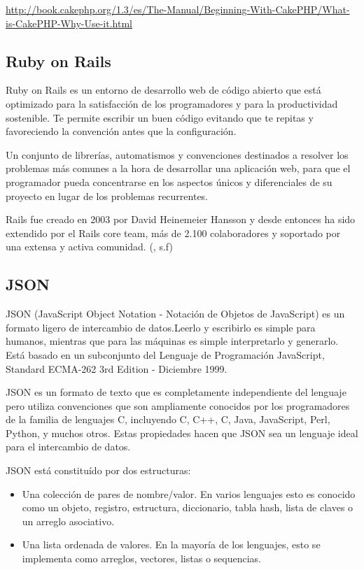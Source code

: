 \url{http://book.cakephp.org/1.3/es/The-Manual/Beginning-With-CakePHP/What-is-CakePHP-Why-Use-it.html}

\subsection{Ruby on Rails}
\setlength{\parskip}{5mm}
Ruby on Rails es un entorno de desarrollo web de código abierto que está optimizado para la satisfacción de los programadores y para la productividad sostenible. Te permite escribir un buen código evitando que te repitas y favoreciendo la convención antes que la configuración.

Un conjunto de librerías, automatismos y convenciones destinados a resolver los problemas más comunes a la hora de desarrollar una aplicación web, para que el programador pueda concentrarse en los aspectos únicos y diferenciales de su proyecto en lugar de los problemas recurrentes.

Rails fue creado en 2003 por David Heinemeier Hansson y desde entonces ha sido extendido por el Rails core team, más de 2.100 colaboradores y soportado por una extensa y activa comunidad. (\citet{rubybib}, s.f)

\setlength{\parskip}{0mm}



\subsection{JSON}
\setlength{\parskip}{5mm}
JSON (JavaScript Object Notation - Notación de Objetos de JavaScript) es un formato ligero de intercambio de datos.Leerlo y escribirlo es simple para humanos, mientras que para las máquinas es simple interpretarlo y generarlo. Está basado en un subconjunto del Lenguaje de Programación JavaScript, Standard ECMA-262 3rd Edition - Diciembre 1999. 

JSON es un formato de texto que es completamente independiente del lenguaje pero utiliza convenciones que son ampliamente conocidos por los programadores de la familia de lenguajes C, incluyendo C, C++, C, Java, JavaScript, Perl, Python, y muchos otros. Estas propiedades hacen que JSON sea un lenguaje ideal para el intercambio de datos.

JSON está constituído por dos estructuras:
 \setlength{\parskip}{0mm}
\begin{itemize}

	\item Una colección de pares de nombre/valor. En varios lenguajes esto es conocido como un objeto, registro, estructura, diccionario, tabla hash, lista de claves o un arreglo asociativo.
	
	\item Una lista ordenada de valores. En la mayoría de los lenguajes, esto se implementa como arreglos, vectores, listas o sequencias.

	
\end{itemize}

